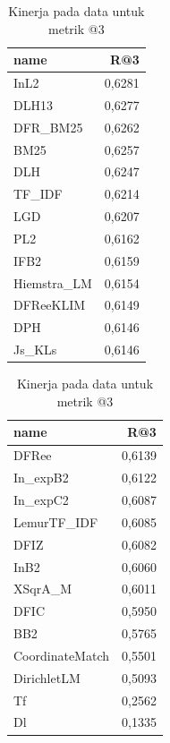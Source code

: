 \begin{table}[!htb]
    \caption{Kinerja \base{} \retriever{} pada data \training{} untuk metrik \recall{}@3}
    \label{tabel:3:base retriever}
    \begin{minipage}{.5\linewidth}
      \centering
        \begin{tabular}{lr}
            \toprule
            name & R@3 \\
            \midrule
            InL2 & 0,6281 \\
            DLH13 & 0,6277 \\
            DFR\_BM25 & 0,6262 \\
            BM25 & 0,6257 \\
            DLH & 0,6247 \\
            TF\_IDF & 0,6214 \\
            LGD & 0,6207 \\
            PL2 & 0,6162 \\
            IFB2 & 0,6159 \\
            Hiemstra\_LM & 0,6154 \\
            DFReeKLIM & 0,6149 \\
            DPH & 0,6146 \\
            Js\_KLs & 0,6146 \\
            \bottomrule
        \end{tabular}
    \end{minipage}
    \begin{minipage}{.5\linewidth}
      \centering
        \begin{tabular}{lr}
            \toprule
            name & R@3 \\
            \midrule
            DFRee & 0,6139 \\
            In\_expB2 & 0,6122 \\
            In\_expC2 & 0,6087 \\
            LemurTF\_IDF & 0,6085 \\
            DFIZ & 0,6082 \\
            InB2 & 0,6060 \\
            XSqrA\_M & 0,6011 \\
            DFIC & 0,5950 \\
            BB2 & 0,5765 \\
            CoordinateMatch & 0,5501 \\
            DirichletLM & 0,5093 \\
            Tf & 0,2562 \\
            Dl & 0,1335 \\
            \bottomrule
        \end{tabular}
    \end{minipage} 
\end{table}

